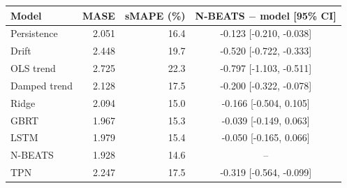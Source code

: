 \begin{tabular}{@{}lrrc@{}}
\toprule
Model & MASE & sMAPE (\%) & N-BEATS $-$ model [95\% CI] \\
\midrule
Persistence & 2.051 & 16.4 & -0.123 [-0.210, -0.038] \\
Drift & 2.448 & 19.7 & -0.520 [-0.722, -0.333] \\
OLS trend & 2.725 & 22.3 & -0.797 [-1.103, -0.511] \\
Damped trend & 2.128 & 17.5 & -0.200 [-0.322, -0.078] \\
Ridge & 2.094 & 15.0 & -0.166 [-0.504, 0.105] \\
GBRT & 1.967 & 15.3 & -0.039 [-0.149, 0.063] \\
LSTM & 1.979 & 15.4 & -0.050 [-0.165, 0.066] \\
N-BEATS & 1.928 & 14.6 & -- \\
TPN & 2.247 & 17.5 & -0.319 [-0.564, -0.099] \\
\bottomrule
\end{tabular}
